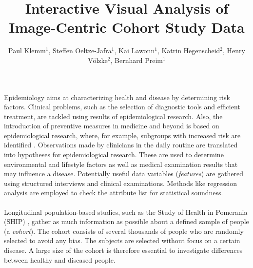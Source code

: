 \documentclass[journal]{style/vgtc} 			          %
\title{Interactive Visual Analysis of Image-Centric Cohort Study Data}
\author{Paul Klemm$^{1}$, Steffen Oeltze-Jafra$^{1}$, Kai Lawonn$^{1}$, Katrin Hegenscheid$^{2}$, Henry V{\"o}lzke$^{2}$, Bernhard Preim$^{1}$}
\begin{document}


\maketitle
Epidemiology aims at characterizing health and disease by determining risk factors.
%
Clinical problems, such as the selection of diagnostic tools and efficient treatment, are tackled using results of epidemiological research.
%
Also, the introduction of preventive measures in medicine and beyond is based on epidemiological research, where, for example, subgroups with increased risk are identified \cite{Fletcher2012}.
%
Observations made by clinicians in the daily routine are translated into hypotheses for epidemiological research.
%
These are used to determine environmental and lifestyle factors as well as medical examination results that may influence a disease.
%
Potentially useful data variables (\emph{features}) are gathered using structured interviews and clinical examinations.
%
Methods like regression analysis are employed to check the attribute list for statistical soundness.
%
\\\\
Longitudinal population-based studies, such as the Study of Health in Pomerania (SHIP) \cite{Volzke2011}, gather as much information as possible about a defined sample of people (a \emph{cohort}).
%
The cohort consists of several thousands of people who are randomly selected to avoid any bias.
%
The subjects are selected without focus on a certain disease.
%
A large size of the cohort is therefore essential to investigate differences between healthy and diseased people.
%
\end{document}

